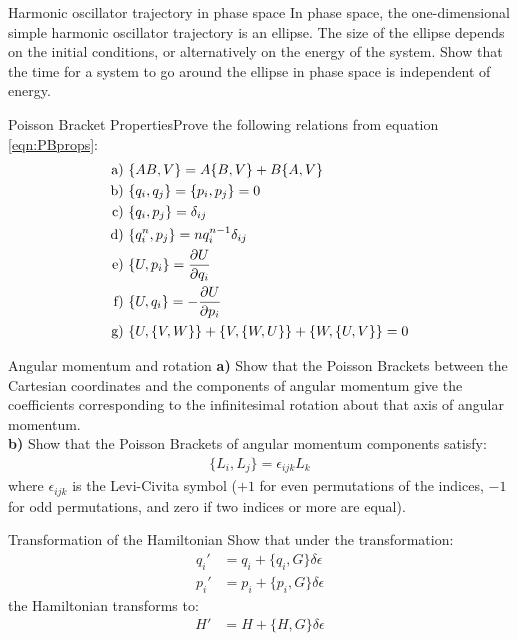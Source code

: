 \begin{problem}{Harmonic oscillator trajectory in phase space} In phase space, the one-dimensional simple harmonic oscillator trajectory is an ellipse. The size of the ellipse depends on the initial conditions, or alternatively on the energy of the system. Show that the time for a system to go around the ellipse in phase space is independent of energy.
\label{prob_Hamilton_6}
\end{problem}

\begin{problem}{Poisson Bracket Properties}Prove the following relations from equation \ref{eqn:PBprops}:
\begin{align*}
\text{a)   }&\{AB,V\}=A\{B,V\}+B\{A,V\}\nonumber\\
\text{b)   }&\{q_i,q_j\}=\{p_i,p_j\}=0\nonumber\\
\text{c)   }&\{q_i,p_j\}=\delta_{ij}\nonumber\\
\text{d)   }&\{q_i^n,p_j\}=nq_i^{n-1}\delta_{ij}\nonumber\\
\text{e)   }&\{U,p_i\}=\frac{\partial U}{\partial q_i}\nonumber\\
\text{f)   }&\{U,q_i\}=-\frac{\partial U}{\partial p_i}\nonumber\\
\text{g)   }&\{U,\{V,W\}\}+\{V,\{W,U\}\}+\{W,\{U,V\}\}=0
\end{align*}
\label{prob_Hamilton_7}
\end{problem}

\begin{problem}{Angular momentum and rotation}
\textbf{a)} Show that the Poisson Brackets between the Cartesian coordinates and the components of angular momentum give the coefficients corresponding to the infinitesimal rotation about that axis of angular momentum.\\
\textbf{b)} Show that the Poisson Brackets of angular momentum components satisfy:
\begin{align*}
\{L_i,L_j\}=\epsilon_{ijk}L_k
\end{align*}
where $\epsilon_{ijk}$ is the Levi-Civita symbol ($+1$ for even permutations of the indices, $-1$ for odd permutations, and zero if two indices or more are equal).
\label{prob_Hamilton_8}
\end{problem}

\begin{problem}{Transformation of the Hamiltonian}
Show that under the transformation:
\begin{align*}
q_i'&=q_i+\{q_i,G\}\delta\epsilon\nonumber\\
p_i'&=p_i+\{p_i,G\}\delta\epsilon
\end{align*}
the Hamiltonian transforms to:
\begin{align*}
H'&=H+\{H,G\}\delta\epsilon
\end{align*}
\label{prob_Hamilton_9}
\end{problem}

